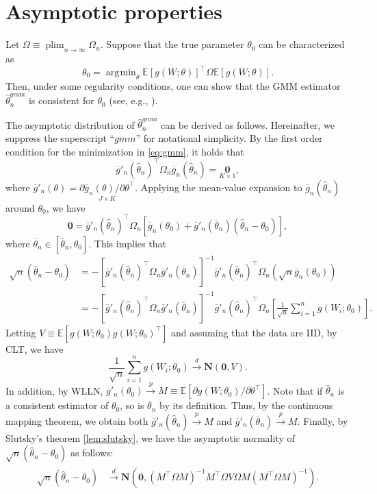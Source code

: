 \documentclass[10.5pt, A4paper, openany, uplatex]{book}
\DeclareMathOperator*{\plim}{plim}
\newcommand{\mbf}{\mathbf}
\newcommand{\E}{\mathbb{E}}
\renewcommand{\hat}{\widehat}
\renewcommand{\bar}{\overline}
\numberwithin{equation}{section}
\DeclareMathOperator*{\argmin}{\arg\!\min}
\begin{document}
\section{Asymptotic properties}\label{sec:asympGMM}
Let $\Omega \equiv \plim_{n \to \infty} \Omega_n$.
Suppose that the true parameter $\theta_0$ can be characterized as
\[
	\theta_0 = \argmin_\theta \E[g(W; \theta)]^\top \Omega \E[g(W; \theta)].
\]
Then, under some regularity conditions, one can show that the GMM estimator $\hat \theta_n^{gmm}$ is consistent for $\theta_0$ (see, e.g., \cite{newey1994large}).

The asymptotic distribution of $\hat\theta_n^{gmm}$ can be derived as follows.
Hereinafter, we suppress the superscript ``$gmm$'' for notational simplicity.
By the first order condition for the minimization in \eqref{eq:gmm}, it holds that
\[
	\bar{g}'_n(\hat\theta_n)^\top \Omega_n \bar{g}_n(\hat\theta_n) = \underset{K \times 1}{\mbf{0}},
\] 
where $\bar{g}'_n( \theta) = \underset{J \times K}{\partial \bar{g}_n(\theta) / \partial \theta^\top}$.
Applying the mean-value expansion to $\bar{g}_n(\hat\theta_n)$ around $\theta_0$, we have
\[
	\mbf{0} = \bar{g}'_n(\hat\theta_n)^\top \Omega_n \left[\bar{g}_n(\theta_0) +  \bar{g}'_n(\bar{\theta}_n) (\hat\theta_n - \theta_0) \right],
\]
where $\bar{\theta}_n \in [ \hat\theta_n, \theta_0]$.
This implies that
\begin{align*}
	\sqrt{n} (\hat\theta_n - \theta_0) 
	& = -\left[ \bar{g}'_n(\hat\theta_n)^\top \Omega_n \bar{g}'_n(\bar{\theta}_n) \right]^{-1} \bar{g}'_n(\hat\theta_n)^\top \Omega_n (\sqrt{n}\bar{g}_n(\theta_0))  \\
	& = -\left[ \bar{g}'_n(\hat\theta_n)^\top \Omega_n \bar{g}'_n(\bar{\theta}_n) \right]^{-1} \bar{g}'_n(\hat\theta_n)^\top \Omega_n \left[\frac{1}{\sqrt{n}}\sum_{i=1}^n g(W_i; \theta_0)\right].
\end{align*}
Letting $V \equiv \E[g(W; \theta_0)g(W; \theta_0)^\top]$ and assuming that the data are IID, by CLT, we have
\[
	\frac{1}{\sqrt{n}}\sum_{i=1}^n g(W_i; \theta_0) \overset{d}{\to} \mbf{N}(\mbf{0}, V).
\]
In addition, by WLLN, $\bar{g}'_n(\theta_0) \overset{p}{\to} M \equiv  \E[ \partial g(W; \theta_0) / \partial \theta^\top]$.
Note that if $\hat\theta_n$ is a consistent estimator of $\theta_0$, so is $\bar{\theta}_n$ by its definition. 
Thus, by the continuous mapping theorem, we obtain both $\bar{g}'_n(\hat\theta_n) \overset{p}{\to} M$ and $\bar{g}'_n(\bar{\theta}_n) \overset{p}{\to} M$.
Finally, by Slutsky's theorem \ref{lem:slutsky}, we have the asymptotic normality of $\sqrt{n} (\hat\theta_n - \theta_0)$ as follows:
\begin{align}\label{eq:GMMnormal}
\begin{split}
	\sqrt{n} (\hat\theta_n - \theta_0) 
	& \overset{d}{\to} \mbf{N}\left(\mbf{0},  (M^\top \Omega M )^{-1} M^\top \Omega V \Omega M ( M^\top \Omega M )^{-1} \right).
\end{split}
\end{align}
\end{document}
